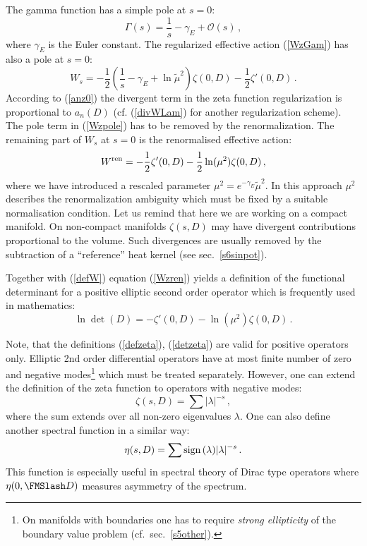 The gamma function has a simple pole at $s=0$:
\begin{equation}
\Gamma (s)=\frac 1s -\gamma_E +\mathcal{O}(s)\,,\label{Gammas}
\end{equation}
where $\gamma_E$ is the Euler constant. The regularized effective action
(\ref{WzGam}) has also a pole at $s=0$:
\begin{equation}
W_s=-\frac 12 \left( \frac 1s -\gamma_E +\ln \tilde\mu^2 \right)
\zeta (0,D) - \frac 12 \zeta'(0,D) \,.\label{Wzpole}
\end{equation}
According to (\ref{anz0}) the divergent term in the zeta function 
regularization is proportional to $a_n(D)$ (cf. (\ref{divWLam}) for another
regularization scheme). The pole term in (\ref{Wzpole}) has to be removed
by the renormalization. The remaining part of $W_s$ at $s=0$ is the 
renormalised effective action:
\begin{equation}
W^{\rm ren}= -\frac 12 \zeta'(0,D)-\frac 12 \ln (\mu^2 )
\zeta (0,D) \,,\label{Wzren}
\end{equation}
where we have introduced a rescaled parameter 
$\mu^2=e^{-\gamma_E}\tilde\mu^2$. In this approach $\mu^2$ describes the
renormalization ambiguity which must be fixed by a suitable
normalisation condition. Let us remind that here we are working on a
compact manifold. On non-compact manifolds $\zeta (s,D)$ may have divergent
contributions proportional to the volume. Such divergences are usually
removed by the subtraction of a ``reference'' heat kernel (see sec.\
\ref{s6sinpot}).

Together with (\ref{defW}) equation (\ref{Wzren}) yields a definition
of the functional determinant for a positive elliptic second order
operator which is frequently used in mathematics:
\begin{equation}
\ln \det (D)=-\zeta'(0,D) -\ln (\mu^2) \zeta (0,D) \,.\label{detzeta}
\end{equation}

Note, that the definitions (\ref{defzeta}), (\ref{detzeta})
are valid for positive operators
only. Elliptic 2nd order differential operators have at most finite number
of zero and negative modes\footnote{On manifolds with boundaries one has to
require {\it strong ellipticity} of the boundary value problem (cf.\
sec.\ \ref{s5other}).} which must be treated separately. However, one 
can extend the definition of the zeta function to operators with negative
modes:
\begin{equation}
\zeta (s,D)=\sum |\lambda |^{-s} \,,\label{zetaneg}
\end{equation}
where the sum extends over all non-zero eigenvalues $\lambda$.
One can also define another spectral function in a similar way:
\begin{equation}
\eta (s,D)=\sum {\rm sign}\, (\lambda ) |\lambda |^{-s} \,.\label{etadef}
\end{equation}
This function is especially useful in spectral theory of Dirac type
operators where $\eta (0,\Dir )$ measures asymmetry of the spectrum.

